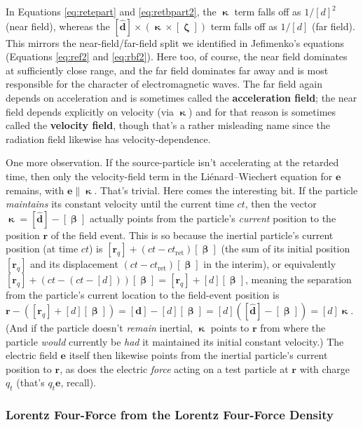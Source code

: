 \documentclass[12pt]{article}
\renewcommand{\vv}[1]{\mathbf{#1}}
\newcommand{\vvbeta}{\bm{\upbeta}}
\newcommand{\vvzeta}{\bm{\upzeta}}
\begin{document}
In Equations \ref{eq:retepart} and \ref{eq:retbpart2}, the $\vv{\upkappa}$ term falls off as $1/[d]^2$ (near field), whereas the $[\vv {\hat{d}}] \times ( \vv{\upkappa} \times [\vvzeta] )$ term falls off as $1/[d]$ (far field). This mirrors the near-field/far-field split we identified in Jefimenko's equations (Equations \ref{eq:ref2} and \ref{eq:rbf2}). Here too, of course, the near field dominates at sufficiently close range, and the far field dominates far away and is most responsible for the character of electromagnetic waves. The far field again depends on acceleration and is sometimes called the \textbf{acceleration field}; the near field depends explicitly on velocity (via $\vv{\upkappa}$) and for that reason is sometimes called the \textbf{velocity field}, though that's a rather misleading name since the radiation field likewise has velocity-dependence.

One more observation. If the source-particle isn't accelerating at the retarded time, then only the velocity-field term in the Li\'enard--Wiechert equation for $\vv e$ remains, with $\vv e \parallel \vv{\upkappa}$. That's trivial. Here comes the interesting bit. If the particle \emph{maintains} its constant velocity until the current time $ct$, then the vector $\vv{\upkappa} = [\vv{\hat{d}}] - [\vvbeta]$ actually points from the particle's \emph{current} position to the position $\vv r$ of the field event. This is so because the inertial particle's current position (at time $ct$) is ${[\vv r_{q}] + (ct - ct_{\mathrm{ret}})[\vvbeta]}$ (the sum of its initial position $[\vv r_{q}]$ and its displacement $(ct - ct_{\mathrm{ret}})[\vvbeta]$ in the interim), or equivalently ${[\vv r_{q}] + (ct - (ct - [d]))[\vvbeta] = [\vv r_{q}] + [d][\vvbeta]}$, meaning the separation from the particle's current location to the field-event position is ${\vv r - ([\vv r_{q}] + [d][\vvbeta]) = [\vv d] - [d][\vvbeta] = [d]([\vv{\hat{d}}] - [\vvbeta]) = [d] \vv{\upkappa}}$. (And if the particle doesn't \emph{remain} inertial, $\vv{\upkappa}$ points to $\vv r$ from where the particle \emph{would} currently be \emph{had} it maintained its initial constant velocity.) The electric field $\vv e$ itself then likewise points from the inertial particle's current position to $\vv r$, as does the electric \emph{force} acting on a test particle at $\vv r$ with charge $q_t$ (that's $q_t \vv e$, recall).


\subsubsection{Lorentz Four-Force from the Lorentz Four-Force Density}\label{sssec:fffffd}
\end{document}

